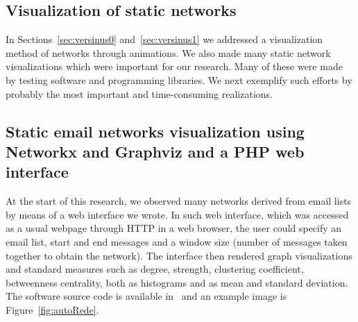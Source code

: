 \begin{apendicesenv}
	\section{Visualization of static networks}
	In Sections~\ref{sec:versinus0} and~\ref{sec:versinus1} we addressed a visualization method of networks through animations.
	We also made many static network visualizations which were important for our research.
	Many of these were made by testing software and programming libraries.
	We next exemplify such efforts by probably the most important and time-consuming realizations.

	\subsection{Static email networks visualization using Networkx and Graphviz and a PHP web interface}\label{sec:autoRede}
	At the start of this research, we observed many networks derived from email lists
	by means of a web interface we wrote.
	In such web interface, which was accessed as a usual webpage through HTTP in a web browser, 
	the user could specify an email list, start and end messages and a window size (number of messages taken together to obtain the network).
	The interface then rendered graph visualizations and standard measures such as degree, strength, clustering coefficient, betweenness centrality, both as histograms and as mean and standard deviation.
	The software source code is available in~\cite{autoRede} and an example image is Figure~\ref{fig:autoRede}.
\begin{figure}[h!]
\begin{center}

\end{center}
\end{figure}
\end{apendicesenv}
